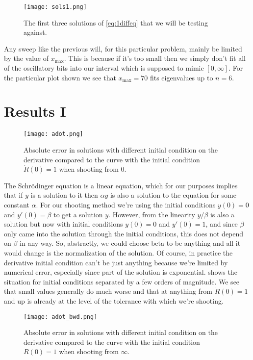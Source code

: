 \documentclass[10pt,a4paper,twocolumn]{article}
\begin{document}
\begin{figure}[!h]
    \centering
    \texttt{[image: sols1.png]}
    \caption{The first three solutions of \cref{eq:1diffeq} that we will be testing against.}
    \label{fig:sols1}
\end{figure}

Any sweep like the previous will, for this particular problem, mainly be limited by the value of $x_{\mathrm{max}}$. This is because if it's too small then we simply don't fit all of the oscillatory bits into our interval which is supposed to mimic $[0, \infty]$. For the particular plot shown we see that $x_{\mathrm{max}} = 70$ fits eigenvalues up to $n=6$.

\section{Results I}

\begin{figure}[!h]
    \centering
    \texttt{[image: adot.png]}
    \caption{Absolute error in solutions with different initial condition on the derivative compared to the curve with the initial condition $\dot{R}(0) = 1$ when shooting from $0$.}
    \label{fig:adot}
\end{figure}

The Schr\"odinger equation is a linear equation, which for our purposes implies that if $y$ is a solution to it then $\alpha y$ is also a solution to the equation for some constant $\alpha$. For our shooting method we're using the initial conditions $y(0) = 0$ and $y'(0) = \beta$ to get a solution $y$. However, from the linearity $y/\beta$ is also a solution but now with initial conditions $y(0) = 0$ and $y'(0) = 1$, and since $\beta$ only came into the solution through the initial conditions, this does not depend on $\beta$ in any way. So, abstractly, we could choose beta to be anything and all it would change is the normalization of the solution. Of course, in practice the derivative initial condition can't be just anything because we're limited by numerical error, especially since part of the solution is exponential.  shows the situation for initial conditions separated by a few orders of magnitude. We see that small values generally do much worse and that at anything from $\dot{R}(0) = 1$ and up is already at the level of the tolerance with which we're shooting.

\begin{figure}[h]
    \centering
    \texttt{[image: adot\_bwd.png]}
    \caption{Absolute error in solutions with different initial condition on the derivative compared to the curve with the initial condition $\dot{R}(0) = 1$ when shooting from $\infty$.}
    \label{fig:adot_bwd}
\end{figure}
\end{document}
